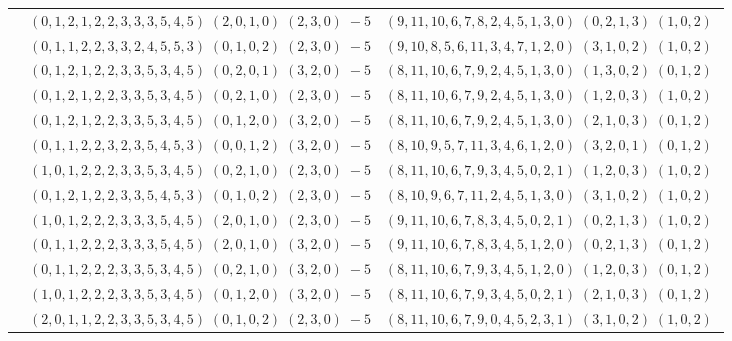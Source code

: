 \documentclass[11pt]{article}
\begin{document}
\begin{longtable}[l]{|c|c|c|}
 \cline{2-3} 
 & $(0 ,1 ,2 ,1 ,2 ,2 ,3 ,3 ,3 ,5 ,4 ,5) \;(2 ,0 ,1 ,0) \;(2 ,3 ,0) \;-5$ & $(9 ,11 ,10 ,6 ,7 ,8 ,2 ,4 ,5 ,1 ,3 ,0) \;(0 ,2 ,1 ,3) \;(1 ,0 ,2) \;$\\ 
 \cline{2-3} 
 & $(0 ,1 ,1 ,2 ,2 ,3 ,3 ,2 ,4 ,5 ,5 ,3) \;(0 ,1 ,0 ,2) \;(2 ,3 ,0) \;-5$ & $(9 ,10 ,8 ,5 ,6 ,11 ,3 ,4 ,7 ,1 ,2 ,0) \;(3 ,1 ,0 ,2) \;(1 ,0 ,2) \;$\\ 
 \cline{2-3} 
 & $(0 ,1 ,2 ,1 ,2 ,2 ,3 ,3 ,5 ,3 ,4 ,5) \;(0 ,2 ,0 ,1) \;(3 ,2 ,0) \;-5$ & $(8 ,11 ,10 ,6 ,7 ,9 ,2 ,4 ,5 ,1 ,3 ,0) \;(1 ,3 ,0 ,2) \;(0 ,1 ,2) \;$\\ 
 \cline{2-3} 
 & $(0 ,1 ,2 ,1 ,2 ,2 ,3 ,3 ,5 ,3 ,4 ,5) \;(0 ,2 ,1 ,0) \;(2 ,3 ,0) \;-5$ & $(8 ,11 ,10 ,6 ,7 ,9 ,2 ,4 ,5 ,1 ,3 ,0) \;(1 ,2 ,0 ,3) \;(1 ,0 ,2) \;$\\ 
 \cline{2-3} 
 & $(0 ,1 ,2 ,1 ,2 ,2 ,3 ,3 ,5 ,3 ,4 ,5) \;(0 ,1 ,2 ,0) \;(3 ,2 ,0) \;-5$ & $(8 ,11 ,10 ,6 ,7 ,9 ,2 ,4 ,5 ,1 ,3 ,0) \;(2 ,1 ,0 ,3) \;(0 ,1 ,2) \;$\\ 
 \cline{2-3} 
 & $(0 ,1 ,1 ,2 ,2 ,3 ,2 ,3 ,5 ,4 ,5 ,3) \;(0 ,0 ,1 ,2) \;(3 ,2 ,0) \;-5$ & $(8 ,10 ,9 ,5 ,7 ,11 ,3 ,4 ,6 ,1 ,2 ,0) \;(3 ,2 ,0 ,1) \;(0 ,1 ,2) \;$\\ 
 \cline{2-3} 
 & $(1 ,0 ,1 ,2 ,2 ,2 ,3 ,3 ,5 ,3 ,4 ,5) \;(0 ,2 ,1 ,0) \;(2 ,3 ,0) \;-5$ & $(8 ,11 ,10 ,6 ,7 ,9 ,3 ,4 ,5 ,0 ,2 ,1) \;(1 ,2 ,0 ,3) \;(1 ,0 ,2) \;$\\ 
 \cline{2-3} 
 & $(0 ,1 ,2 ,1 ,2 ,2 ,3 ,3 ,5 ,4 ,5 ,3) \;(0 ,1 ,0 ,2) \;(2 ,3 ,0) \;-5$ & $(8 ,10 ,9 ,6 ,7 ,11 ,2 ,4 ,5 ,1 ,3 ,0) \;(3 ,1 ,0 ,2) \;(1 ,0 ,2) \;$\\ 
 \cline{2-3} 
 & $(1 ,0 ,1 ,2 ,2 ,2 ,3 ,3 ,3 ,5 ,4 ,5) \;(2 ,0 ,1 ,0) \;(2 ,3 ,0) \;-5$ & $(9 ,11 ,10 ,6 ,7 ,8 ,3 ,4 ,5 ,0 ,2 ,1) \;(0 ,2 ,1 ,3) \;(1 ,0 ,2) \;$\\ 
 \cline{2-3} 
 & $(0 ,1 ,1 ,2 ,2 ,2 ,3 ,3 ,3 ,5 ,4 ,5) \;(2 ,0 ,1 ,0) \;(3 ,2 ,0) \;-5$ & $(9 ,11 ,10 ,6 ,7 ,8 ,3 ,4 ,5 ,1 ,2 ,0) \;(0 ,2 ,1 ,3) \;(0 ,1 ,2) \;$\\ 
 \cline{2-3} 
 & $(0 ,1 ,1 ,2 ,2 ,2 ,3 ,3 ,5 ,3 ,4 ,5) \;(0 ,2 ,1 ,0) \;(3 ,2 ,0) \;-5$ & $(8 ,11 ,10 ,6 ,7 ,9 ,3 ,4 ,5 ,1 ,2 ,0) \;(1 ,2 ,0 ,3) \;(0 ,1 ,2) \;$\\ 
 \cline{2-3} 
 & $(1 ,0 ,1 ,2 ,2 ,2 ,3 ,3 ,5 ,3 ,4 ,5) \;(0 ,1 ,2 ,0) \;(3 ,2 ,0) \;-5$ & $(8 ,11 ,10 ,6 ,7 ,9 ,3 ,4 ,5 ,0 ,2 ,1) \;(2 ,1 ,0 ,3) \;(0 ,1 ,2) \;$\\ 
 \cline{2-3} 
 & $(2 ,0 ,1 ,1 ,2 ,2 ,3 ,3 ,5 ,3 ,4 ,5) \;(0 ,1 ,0 ,2) \;(2 ,3 ,0) \;-5$ & $(8 ,11 ,10 ,6 ,7 ,9 ,0 ,4 ,5 ,2 ,3 ,1) \;(3 ,1 ,0 ,2) \;(1 ,0 ,2) \;$\\ 

\end{longtable}
\end{document}
